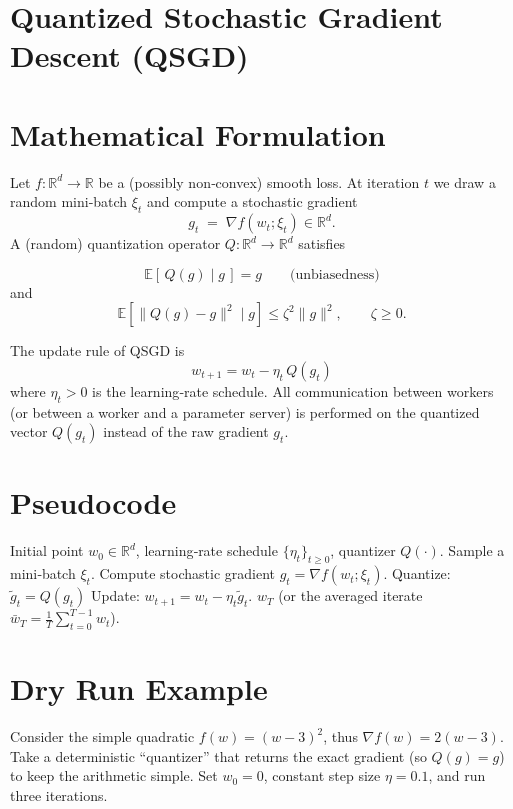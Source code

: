 \documentclass{article}
\begin{document}
\section*{Quantized Stochastic Gradient Descent (QSGD)}

\section*{Mathematical Formulation}
Let $f:\mathbb{R}^{d}\rightarrow\mathbb{R}$ be a (possibly non‑convex) smooth loss.  
At iteration $t$ we draw a random mini‑batch $\xi_{t}$ and compute a stochastic gradient
\[
g_{t}\;=\;\nabla f(w_{t};\xi_{t})\in\mathbb{R}^{d}.
\]
A (random) quantization operator $Q:\mathbb{R}^{d}\rightarrow\mathbb{R}^{d}$ satisfies  

\[
\mathbb{E}\!\left[\,Q(g)\mid g\,\right]=g\qquad\text{(unbiasedness)}\tag{1}
\]
and
\[
\mathbb{E}\!\left[\|Q(g)-g\|^{2}\mid g\right]\leq \zeta^{2}\|g\|^{2},\qquad \zeta\ge 0.\tag{2}
\]

The update rule of QSGD is
\[
\boxed{\,w_{t+1}=w_{t}-\eta_{t}\,Q(g_{t})\,}\tag{3}
\]
where $\eta_{t}>0$ is the learning‑rate schedule.  
All communication between workers (or between a worker and a parameter server) is performed on the quantized vector $Q(g_{t})$ instead of the raw gradient $g_{t}$.

\section*{Pseudocode}
\begin{algorithm}[H]
\caption{Quantized Stochastic Gradient Descent (QSGD)}\label{alg:qsgd}
\begin{algorithmic}[1]
\Require Initial point $w_{0}\in\mathbb{R}^{d}$, learning‑rate schedule $\{\eta_{t}\}_{t\ge0}$, quantizer $Q(\cdot)$.
    \State Sample a mini‑batch $\xi_{t}$.
    \State Compute stochastic gradient $g_{t}= \nabla f(w_{t};\xi_{t})$.
    \State Quantize: $\tilde g_{t}=Q(g_{t})$   
    \State Update: $w_{t+1}= w_{t}-\eta_{t}\tilde g_{t}$.
\EndFor
\State \Return $w_{T}$ (or the averaged iterate $\bar w_{T}=\tfrac{1}{T}\sum_{t=0}^{T-1}w_{t}$).
\end{algorithmic}
\end{algorithm}

\section*{Dry Run Example}
Consider the simple quadratic $f(w)=(w-3)^{2}$, thus $\nabla f(w)=2(w-3)$.  
Take a deterministic ``quantizer'' that returns the exact gradient (so $Q(g)=g$) to keep the arithmetic simple.  
Set $w_{0}=0$, constant step size $\eta=0.1$, and run three iterations.
\end{document}
